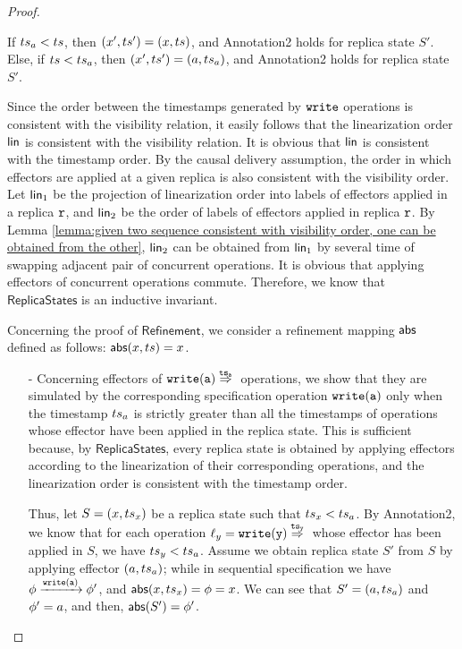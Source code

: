 \begin {proof}
\begin{itemize}
    If $ts_a < ts$, then $(x',ts') = (x,ts)$, and Annotation2 holds for replica state $S'$. Else, if $ts < ts_a$, then $(x',ts') = (a,ts_a)$, and Annotation2 holds for replica state $S'$.
\end{itemize}

Since the order between the timestamps generated by ${\tt write}$ operations is consistent with the visibility relation, it easily follows that the linearization order $\mathsf{lin}$ is consistent with the visibility relation. It is obvious that $\mathsf{lin}$ is consistent with the timestamp order. By the causal delivery assumption, the order in which effectors are applied at a given replica is also consistent with the visibility order. Let $\mathsf{lin}_1$ be the projection of linearization order into labels of effectors applied in a replica $\mathtt{r}$, and $\mathsf{lin}_2$ be the order of labels of effectors applied in replica $\mathtt{r}$. By Lemma \ref{lemma:given two sequence consistent with visibility order, one can be obtained from the other}, $\mathsf{lin}_2$ can be obtained from $\mathsf{lin}_1$ by several time of swapping adjacent pair of concurrent operations. It is obvious that applying effectors of concurrent operations commute. Therefore, we know that $\mathsf{ReplicaStates}$ is an inductive invariant.

Concerning the proof of $\mathsf{Refinement}$, we consider a refinement mapping $\mathsf{abs}$ defined as follows: $\mathsf{abs}(x,ts) = x$.

\begin{itemize}
\setlength{\itemsep}{0.5pt}
\item[-] Concerning effectors of $\alabellongind[{\tt write}]{a}{}{\ats_a}{}$ operations, we show that they are simulated by the corresponding specification operation $\alabelshort[{\tt write}]{a}$ only when the timestamp $ts_a$ is strictly greater than all the timestamps of operations whose effector have been applied in the replica state. This is sufficient because, by $\mathsf{ReplicaStates}$, every replica state is obtained by applying effectors according to the linearization of their corresponding operations, and the linearization order is consistent with the timestamp order.

    Thus, let $S = (x,ts_x)$ be a replica state such that $ts_x < ts_a$. By Annotation2, we know that for each operation $\alabel_y = \alabellongind[{\tt write}]{y}{}{\ats_y}{}$ whose effector has been applied in $S$, we have $ts_y < ts_a$. Assume we obtain replica state $S'$ from $S$ by applying effector $(a,ts_a)$; while in sequential specification we have $\abstate \xrightarrow{\alabelshort[{\tt write}]{a}} \abstate'$, and $\mathsf{abs}(x,ts_x) = \phi = x$. We can see that $S' = (a,ts_a)$ and $\phi' = a$, and then, $\mathsf{abs}(S') = \phi'$.


\end{itemize}
\end{proof}

